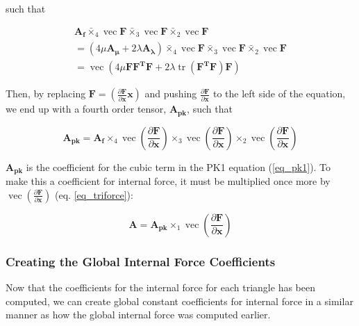 \documentclass[twocolumn,10pt]{asme2ej}
\DeclareMathOperator{\vect}{vec}
\DeclareMathOperator{\tr}{tr}
\begin{document}
such that

\begin{multline}
    \bm{A_f} \bar{\times}_4 \vect \bm{F} \bar{\times}_3 \vect \bm{F}  \bar{\times}_2 \vect \bm{F}
    \\ = \left( 4\mu\bm{A_{\mu}} + 2\lambda\bm{A_{\lambda}}\right) \bar{\times}_4 \vect \bm{F} \bar{\times}_3 \vect \bm{F} \bar{\times}_2 \vect \bm{F}
    \\ = \vect \left( 4\mu\bm{FF^TF} + 2\lambda\tr\left(\bm{F^TF}\right)\bm{F}\right)
\end{multline}

Then, by replacing $\bm{F} = \left( \frac{\partial \bm{F}}{\partial \bm{x}} \bm{x}\right)$ and pushing $\frac{\partial \bm{F}}{\partial \bm{x}}$ to the left side of the equation, we end up with a fourth order tensor, $\bm{A_{pk}}$, such that

\begin{equation}
\bm{A_{pk}} = \bm{A_f} \times_4 \vect \left(\frac{\partial \bm{F}}{\partial \bm{x}} \right)
\times_3 \vect \left(\frac{\partial \bm{F}}{\partial \bm{x}} \right)
\times_2 \vect \left(\frac{\partial \bm{F}}{\partial \bm{x}} \right)
\end{equation}

$\bm{A_{pk}}$ is the coefficient for the cubic term in the PK1 equation (\ref{eq_pk1}). To make this a coefficient for internal force, it must be multiplied once more by $\vect \left(\frac{\partial \bm{F}}{\partial \bm{x}} \right)$ (eq. \ref{eq_triforce}):

\begin{equation}
\bm{A} = \bm{A_{pk}} \times_1 \vect \left(\frac{\partial \bm{F}}{\partial \bm{x}} \right)
\label{eq_cubicTerm}
\end{equation}

\subsubsection{Creating the Global Internal Force Coefficients}

Now that the coefficients for the internal force for each triangle has been computed, we can create global constant coefficients for internal force in a similar manner as how the global internal force was computed earlier.
\end{document}
